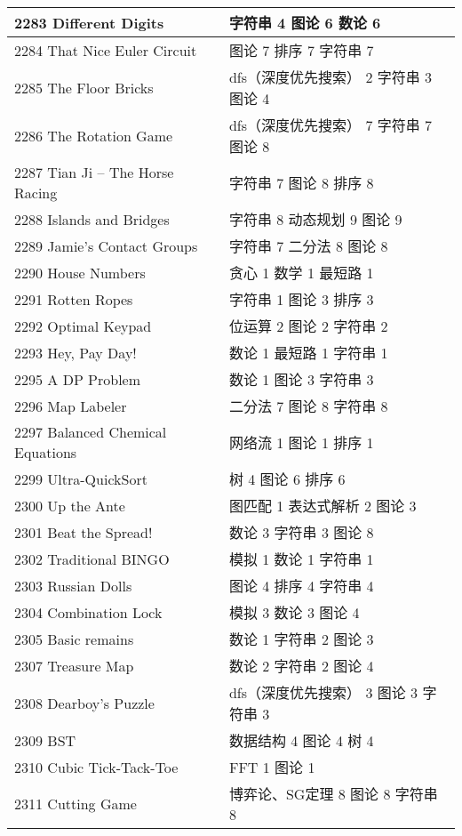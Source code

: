 \begin{longtable}{| p{} | p{} |}
 2283 Different Digits  & 字符串 4 图论 6 数论 6 \\ \hline
 2284 That Nice Euler Circuit  & 图论 7 排序 7 字符串 7 \\ \hline
 2285 The Floor Bricks  & dfs（深度优先搜索） 2 字符串 3 图论 4 \\ \hline
 2286 The Rotation Game  & dfs（深度优先搜索） 7 字符串 7 图论 8 \\ \hline
 2287 Tian Ji -- The Horse Racing  & 字符串 7 图论 8 排序 8 \\ \hline
 2288 Islands and Bridges  & 字符串 8 动态规划 9 图论 9 \\ \hline
 2289 Jamie's Contact Groups  & 字符串 7 二分法 8 图论 8 \\ \hline
 2290 House Numbers  & 贪心 1 数学 1 最短路 1 \\ \hline
 2291 Rotten Ropes  & 字符串 1 图论 3 排序 3 \\ \hline
 2292 Optimal Keypad  & 位运算 2 图论 2 字符串 2 \\ \hline
 2293 Hey, Pay Day!  & 数论 1 最短路 1 字符串 1 \\ \hline
 2295 A DP Problem  & 数论 1 图论 3 字符串 3 \\ \hline
 2296 Map Labeler  & 二分法 7 图论 8 字符串 8 \\ \hline
 2297 Balanced Chemical Equations  & 网络流 1 图论 1 排序 1 \\ \hline
 2299 Ultra-QuickSort  & 树 4 图论 6 排序 6 \\ \hline
 2300 Up the Ante  & 图匹配 1 表达式解析 2 图论 3 \\ \hline
 2301 Beat the Spread!  & 数论 3 字符串 3 图论 8 \\ \hline
 2302 Traditional BINGO  & 模拟 1 数论 1 字符串 1 \\ \hline
 2303 Russian Dolls  & 图论 4 排序 4 字符串 4 \\ \hline
 2304 Combination Lock  & 模拟 3 数论 3 图论 4 \\ \hline
 2305 Basic remains  & 数论 1 字符串 2 图论 3 \\ \hline
 2307 Treasure Map  & 数论 2 字符串 2 图论 4 \\ \hline
 2308 Dearboy's Puzzle  & dfs（深度优先搜索） 3 图论 3 字符串 3 \\ \hline
 2309 BST  & 数据结构 4 图论 4 树 4 \\ \hline
 2310 Cubic Tick-Tack-Toe  & FFT 1 图论 1 \\ \hline
 2311 Cutting Game  & 博弈论、SG定理 8 图论 8 字符串 8 \\ \hline

\end{longtable}
